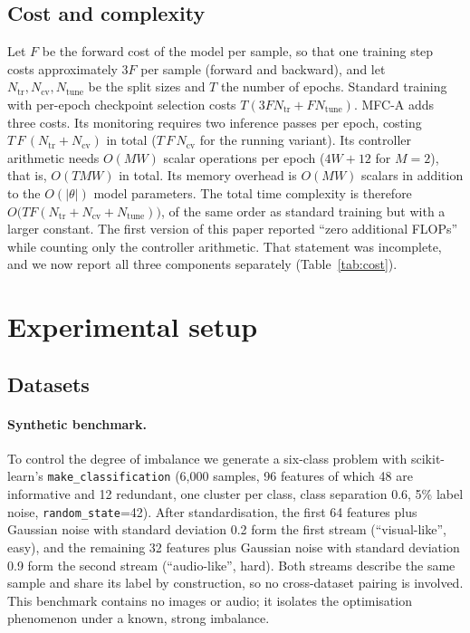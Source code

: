 \documentclass[fleqn,10pt]{wlscirep}
\begin{document}
\subsection*{Cost and complexity}
Let $F$ be the forward cost of the model per sample, so that one training step costs approximately $3F$ per sample (forward and backward), and let $N_{\mathrm{tr}},N_{\mathrm{cv}},N_{\mathrm{tune}}$ be the split sizes and $T$ the number of epochs. Standard training with per-epoch checkpoint selection costs $T(3FN_{\mathrm{tr}}+FN_{\mathrm{tune}})$. MFC-A adds three costs. Its monitoring requires two inference passes per epoch, costing $T\,F\,(N_{\mathrm{tr}}+N_{\mathrm{cv}})$ in total ($T\,F\,N_{\mathrm{cv}}$ for the running variant). Its controller arithmetic needs $O(MW)$ scalar operations per epoch ($4W{+}12$ for $M{=}2$), that is, $O(TMW)$ in total. Its memory overhead is $O(MW)$ scalars in addition to the $O(|\theta|)$ model parameters.
The total time complexity is therefore $O\big(TF(N_{\mathrm{tr}}+N_{\mathrm{cv}}+N_{\mathrm{tune}})\big)$, of the same order as standard training but with a larger constant. The first version of this paper reported ``zero additional FLOPs'' while counting only the controller arithmetic. That statement was incomplete, and we now report all three components separately (Table~\ref{tab:cost}).

\section*{Experimental setup}
\subsection*{Datasets}
\paragraph{Synthetic benchmark.} To control the degree of imbalance we generate a six-class problem with scikit-learn's \texttt{make\_classification} (6,000 samples, 96 features of which 48 are informative and 12 redundant, one cluster per class, class separation 0.6, 5\% label noise, \texttt{random\_state}=42). After standardisation, the first 64 features plus Gaussian noise with standard deviation 0.2 form the first stream (``visual-like'', easy), and the remaining 32 features plus Gaussian noise with standard deviation 0.9 form the second stream (``audio-like'', hard). Both streams describe the same sample and share its label by construction, so no cross-dataset pairing is involved. This benchmark contains no images or audio; it isolates the optimisation phenomenon under a known, strong imbalance.
\end{document}
